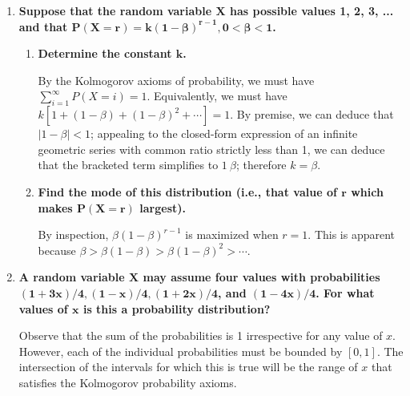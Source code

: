 \documentclass[10pt, oneside]{article}   	%
\theoremstyle{definition}
\begin{document}
\begin{enumerate}[label=4.\arabic*]
\item  \begin{tcolorbox}[
  colback=Cerulean!5!white,
  colframe=Cerulean!75!black]
\textbf{Suppose that the random variable $\bm{X}$ has possible values 1, 2, 3, ... and that $\bm{P(X = r) = k(1 - \beta)^{r - 1}, 0 < \beta < 1}$.}
\end{tcolorbox}

	\begin{enumerate}
	\item  \begin{tcolorbox}[
	  colback=Cerulean!5!white,
	  colframe=Cerulean!75!black]
	\textbf{Determine the constant $\bm{k}$.}
	\end{tcolorbox}
	
	By the Kolmogorov axioms of probability, we must have $\sum^\infty_{i=1} P(X = i) = 1$. Equivalently, we must have $k [ 1 + (1 - \beta) + (1 - \beta)^2 + \cdots] = 1$. By premise, we can deduce that $|1 - \beta| < 1$; appealing to the closed-form expression of an infinite geometric series with common ratio strictly less than 1, we can deduce that the bracketed term simplifies to $1 \ \beta$; therefore $\boxed{k = \beta}$.
	
	\item  \begin{tcolorbox}[
	  colback=Cerulean!5!white,
	  colframe=Cerulean!75!black]
	\textbf{Find the mode of this distribution (i.e., that value of $\bm{r}$ which makes $\bm{P(X = r)}$ largest).}
	\end{tcolorbox}
	
	By inspection, $\beta (1 - \beta)^{r-1}$ is maximized when $\boxed{r = 1}$. This is apparent because $\beta > \beta(1 - \beta) > \beta(1 - \beta)^2 > \cdots$. 

	\end{enumerate}
	
\item  \begin{tcolorbox}[
  colback=Cerulean!5!white,
  colframe=Cerulean!75!black]
\textbf{A random variable $\bm{X}$ may assume four values with probabilities $\bm{(1 + 3x) / 4, (1-x)/4, (1+2x)/4}$, and $\bm{(1-4x) / 4}$. For what values of $\bm{x}$ is this a probability distribution?}
\end{tcolorbox}

Observe that the sum of the probabilities is 1 irrespective for any value of $x$. However, each of the individual probabilities must be bounded by $[0,1]$. The intersection of the intervals for which this is true will be the range of $x$ that satisfies the Kolmogorov probability axioms.


\end{enumerate}
\end{document}
